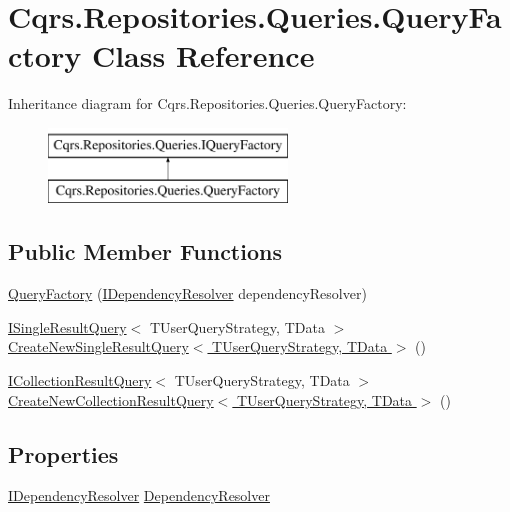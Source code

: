 \hypertarget{classCqrs_1_1Repositories_1_1Queries_1_1QueryFactory}{}\section{Cqrs.\+Repositories.\+Queries.\+Query\+Factory Class Reference}
\label{classCqrs_1_1Repositories_1_1Queries_1_1QueryFactory}
Inheritance diagram for Cqrs.\+Repositories.\+Queries.\+Query\+Factory\+:\begin{figure}[H]
\begin{center}
\leavevmode
\includegraphics[height=2.000000cm]{classCqrs_1_1Repositories_1_1Queries_1_1QueryFactory}
\end{center}
\end{figure}
\subsection*{Public Member Functions}
\begin{DoxyCompactItemize}
\item 
\hyperlink{classCqrs_1_1Repositories_1_1Queries_1_1QueryFactory_a8956a30f5d8abbf49ca4ca24756a83da_a8956a30f5d8abbf49ca4ca24756a83da}{Query\+Factory} (\hyperlink{interfaceCqrs_1_1Configuration_1_1IDependencyResolver}{I\+Dependency\+Resolver} dependency\+Resolver)
\item 
\hyperlink{interfaceCqrs_1_1Repositories_1_1Queries_1_1ISingleResultQuery}{I\+Single\+Result\+Query}$<$ T\+User\+Query\+Strategy, T\+Data $>$ \hyperlink{classCqrs_1_1Repositories_1_1Queries_1_1QueryFactory_aefca41f8cab3f333984b782e7c87f3d1_aefca41f8cab3f333984b782e7c87f3d1}{Create\+New\+Single\+Result\+Query$<$ T\+User\+Query\+Strategy, T\+Data $>$} ()
\item 
\hyperlink{interfaceCqrs_1_1Repositories_1_1Queries_1_1ICollectionResultQuery}{I\+Collection\+Result\+Query}$<$ T\+User\+Query\+Strategy, T\+Data $>$ \hyperlink{classCqrs_1_1Repositories_1_1Queries_1_1QueryFactory_aaadcf9eb14390c49d668023a9e9950d7_aaadcf9eb14390c49d668023a9e9950d7}{Create\+New\+Collection\+Result\+Query$<$ T\+User\+Query\+Strategy, T\+Data $>$} ()
\end{DoxyCompactItemize}
\subsection*{Properties}
\begin{DoxyCompactItemize}
\item 
\hyperlink{interfaceCqrs_1_1Configuration_1_1IDependencyResolver}{I\+Dependency\+Resolver} \hyperlink{classCqrs_1_1Repositories_1_1Queries_1_1QueryFactory_a550e1e11b126247c5adebdd384000252_a550e1e11b126247c5adebdd384000252}{Dependency\+Resolver}
\end{DoxyCompactItemize}



